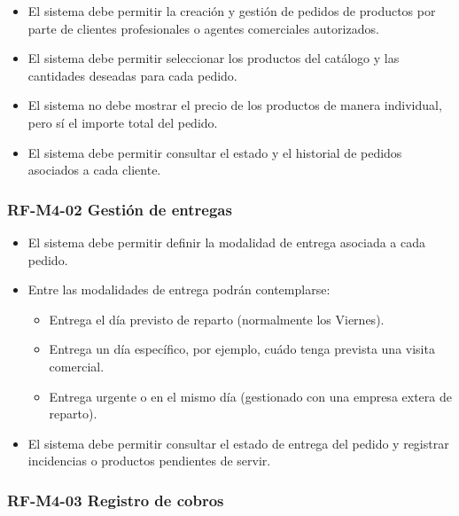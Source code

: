 \begin{itemize}
    \item El sistema debe permitir la creación y gestión de pedidos de productos por parte de clientes profesionales o agentes comerciales autorizados.
    \item El sistema debe permitir seleccionar los productos del catálogo y las cantidades deseadas para cada pedido.
    \item El sistema no debe mostrar el precio de los productos de manera individual, pero sí el importe total del pedido.
    \item El sistema debe permitir consultar el estado y el historial de pedidos asociados a cada cliente.
\end{itemize}

\vspace{-0.75em}
\subsubsection{RF-M4-02 Gestión de entregas}
\vspace{-1em}

\begin{itemize}
    \item El sistema debe permitir definir la modalidad de entrega asociada a cada pedido.
    \item Entre las modalidades de entrega podrán contemplarse:
          \begin{itemize}
              \item Entrega el día previsto de reparto (normalmente los Viernes).
              \item Entrega un día específico, por ejemplo, cuádo tenga prevista una visita comercial.
              \item Entrega urgente o en el mismo día (gestionado con una empresa extera de reparto).
          \end{itemize}
    \item El sistema debe permitir consultar el estado de entrega del pedido y registrar incidencias o productos pendientes de servir.
\end{itemize}

\vspace{-0.75em}
\subsubsection{RF-M4-03 Registro de cobros}
\vspace{-1em}

